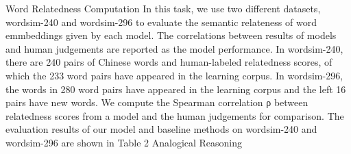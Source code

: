 Word Relatedness Computation
In this task, we use two different datasets, wordsim-240 and wordsim-296 to evaluate the semantic relateness of word emmbeddings given by each model. The correlations between results of models and human judgements are reported as the model performance. 
In wordsim-240, there are 240 pairs of Chinese words and human-labeled relatedness scores, of which the 233 word pairs have appeared in the learning corpus. In wordsim-296, the words in 280 word pairs have appeared in the learning corpus and the left 16 pairs have new words.
We compute the Spearman correlation ρ between relatedness scores from a model and the human judgements for comparison. The evaluation results of our model and baseline methods on wordsim-240 and wordsim-296 are shown in Table 2
Analogical Reasoning